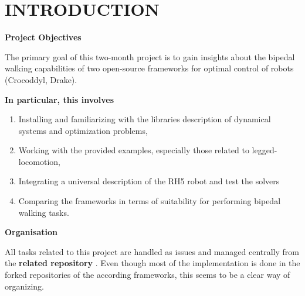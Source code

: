 \chapter{INTRODUCTION}
\textbf{Project Objectives}

The primary goal of this two-month project is to gain insights about the bipedal walking capabilities of two open-source frameworks for optimal control of robots (Crocoddyl, Drake).

\textbf{In particular, this involves}
\begin{enumerate}
\item Installing and familiarizing with the libraries description of dynamical systems and optimization problems,
\item Working with the provided examples, especially those related to legged-locomotion,
\item Integrating a universal description of the RH5 robot and test the solvers 
\item Comparing the frameworks in terms of suitability for performing bipedal walking tasks.
\end{enumerate}

\textbf{Organisation}

All tasks related to this project are handled as issues and managed centrally from the \textbf{related repository} \cite{julesserOCFrameworks}.
Even though most of the implementation  is done in the forked repositories of the according frameworks, this seems to be a clear way of organizing. 